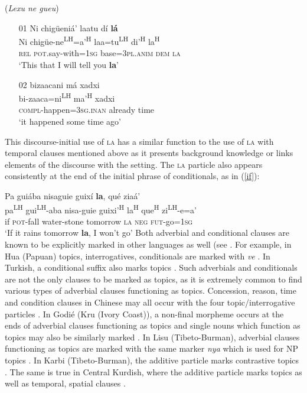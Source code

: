 \ea\label{initial2} (\textit{Lexu ne gueu})
\begin{itemize}
\item[01]
\glll Ni chig\"{u}eni\'{a}' laatu d\'{i} \textbf{l\'{a}}  \\
Ni chig\"{u}e-ne\textsuperscript{LH}=a'\textsuperscript{H} laa=tu\textsuperscript{LH} di'\textsuperscript{H}  la\textsuperscript{H}  \\
\textsc{rel} \textsc{pot}.say-with=1\textsc{sg} base=3\textsc{pl.anim} \textsc{dem} \textsc{la}  \\
\glt  `This that I will tell you \textbf{la}'


\item[02]
\glll bizaacani m\'{a} xadxi  \\
bi-zaaca=ni\textsuperscript{LH} ma'\textsuperscript{H} xadxi  \\
\textsc{compl}-happen=3\textsc{sg.inan} already time  \\
\glt  `it happened some time ago'

\end{itemize}
\z
This discourse-initial use of \textsc{la} has a similar function to the use of \textsc{la} with temporal clauses mentioned above as it presents background knowledge or links elements of the discourse with the setting. The \textsc{la} particle also appears consistently at the end of the initial phrase of conditionals, as in (\ref{if}):

\ea\label{if}
\glll Pa gui\'{a}ba nisaguie guix\'{i} \textbf{la}, qu\'{e} zia\'{a}'  \\
pa\textsuperscript{LH} gui\textsuperscript{LH}-aba nisa-guie guixi'\textsuperscript{H}  la\textsuperscript{H} que\textsuperscript{H} zi\textsuperscript{LH}-e=a'  \\
if \textsc{pot}-fall water-stone tomorrow \textsc{la} \textsc{neg} \textsc{fut}-go=1\textsc{sg}  \\
\glt `If it rains tomorrow \textbf{la}, I won't go' \hfill \citep[109]{pickett1998}
\z
Both adverbial and conditional clauses are known to be explicitly marked in other languages as well (see \citet[292]{thompson2007}. For example, in Hua (Papuan) topics, interrogatives, conditionals are marked with \textit{ve} \citep{haiman1978}. In Turkish, a conditional suffix also marks topics \citep{kerslake1996}. Such adverbials and conditionals are not the only clauses to be marked as topics, as it is extremely common to find various types of adverbial clauses functioning as topics. Concession, reason, time and condition clauses in Chinese may all occur with the four topic/interrogative particles \citep[293]{thompson2007}. In Godi\'{e} (Kru (Ivory Coast)), a non-final morpheme occurs at the ends of adverbial clauses functioning as topics and single nouns which function as topics may also be similarly marked \citep{marchese1977,marchese1987}. In Lisu (Tibeto-Burman), adverbial clauses functioning as topics are marked with the same marker \textit{nya} which is used for NP topics \citet[294]{thompson2007}. In Karbi (Tibeto-Burman), the additive particle marks contrastive topics \citep{konnerth2013}. The same is true in Central Kurdish, where the additive particle marks topics as well as temporal, spatial clauses \citep{opengin2013}.

